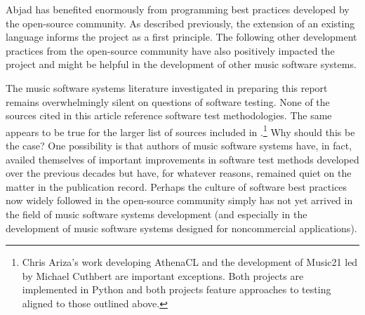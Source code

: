 \documentclass{article}
\begin{document}
Abjad has benefited enormously from programming best practices developed by the
open-source community. As described previously, the extension of an existing
language informs the project as a first principle. The following other development practices
from the open-source community have also positively impacted the project and
might be helpful in the development of other music software systems.

The music software systems literature investigated in preparing this report
remains overwhelmingly silent on questions of software testing. None of the
sources cited in this article reference software test methodologies. The same
appears to be true for the larger list of sources included in
\cite{trevino2013compositional}.\footnote{Chris Ariza's work developing
AthenaCL \cite{Ariza2005} and the development of Music21 \cite{Ariza2010} led
by Michael Cuthbert are important exceptions. Both projects are implemented in
Python and both projects feature approaches to testing aligned to those
outlined above.} Why should this be the case? One possibility is that authors
of music software systems have, in fact, availed themselves of important
improvements in software test methods developed over the previous decades but
have, for whatever reasons, remained quiet on the matter in the publication
record. Perhaps the culture of software best practices now widely followed in
the open-source community simply has not yet arrived in the field of music
software systems development (and especially in the development of music
software systems designed for noncommercial applications).
\end{document}
